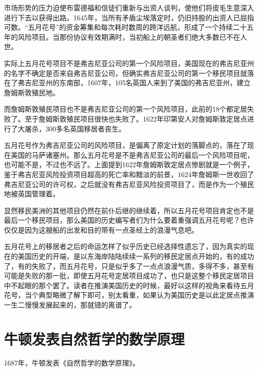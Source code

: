 \documentclass[12pt,oneside]{book}
\begin{document}
\begin{bookref}[frametitle={\cite{美国四百年}}]
市场形势的压力迫使布雷德福和信徒们重新与出资人谈判，使他们将皮毛生意深入进行下去以获得出路。1645年，当所有矛盾尘埃落定时，仍旧持股的出资人已屈指可数。“五月花号”的资金筹集和每次耗时数周的跨洋远航，形成了一个持续二十五年的风险项目。当那份协议有效期满时，当初船上的朝圣者们绝大多数已不在人世。

\end{bookref}

实际上五月花号项目不是弗吉尼亚公司的第一个风险项目，美国现在的弗吉尼亚州的名字不确定是否来自弗吉尼亚公司，但确实弗吉尼亚公司的第一个移民项目就落在了弗吉尼亚州的东南部，1607年，105名英国人来到了美国的弗吉尼亚州，建立詹姆斯敦殖民地。

而詹姆斯敦殖民项目也不是弗吉尼亚公司的第一个风险项目，此前的18个都定居失败了。至于詹姆斯敦殖民项目很快也失败了。1622年印第安人对詹姆斯敦定居点进行了大屠杀，300多名英国移居者丧生。

五月花号作为弗吉尼亚公司的风险项目，是偏离了原定计划的落脚点的，落在了现在美国的马萨诸塞州。那么五月花号是不是弗吉尼亚公司的最后一个风险项目呢，也可能不是，不过也不远了。上面提到1622年詹姆斯敦定居点惨剧就是一个例子，鉴于弗吉尼亚风险投资项目超高的死亡率和黯淡的前景，1624年詹姆斯一世收回了弗吉尼亚公司的许可权，之后就没有弗吉尼亚风险投资项目了，而是作为一个殖民地被英国管理着。

显然移民美洲的其他项目仍然在前仆后继的继续着，所以五月花号项目肯定也不是最后一个移民项目，那么美国的历史编写者们为什么要着重强调五月花号呢？也许仅仅是因为这艘船的出发和目的带有一点圣经上的浪漫气息吧。

五月花号上的移居者之后的命运怎样了似乎历史已经选择性遗忘了，因为真实的现在的美国历史的开端，是以东海岸陆陆续续一系列的移民定居点开始的，有的成功了，有的失败了，而五月花号，只是似乎多了一点点浪漫气质，多得不多，甚至有可能是失败的那一批，即使五月花号定居项目成功了，也只是这整个移民定居项目中不起眼的那个罢了。读者在推演美国历史的时候，最好以这样的视角来看待五月花号，当个典型略微了解下即可，别太看重，如果认为美国历史是以此定居点推演一生二慢慢发展起来的，那就错的离谱了。




\chapter{牛顿发表自然哲学的数学原理}
1687年，牛顿发表《自然哲学的数学原理》。
\end{document}
